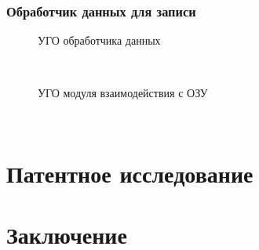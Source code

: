 \documentclass[13pt]{article}
\begin{document}
	\subsubsection{Обработчик данных для записи}
	\begin{figure}[h!]
		\caption{УГО обработчика данных}
	\end{figure}\\
	\begin{figure}[h!]
		\caption{УГО модуля взаимодействия с ОЗУ}
	\end{figure}\\
	\newpage
	\section{Патентное исследование}
	\newpage
	\setcounter{secnumdepth}{-1}
	\section{Заключение}
	\newpage
	\printbibliography[heading=bibintoc]
	
\end{document}

